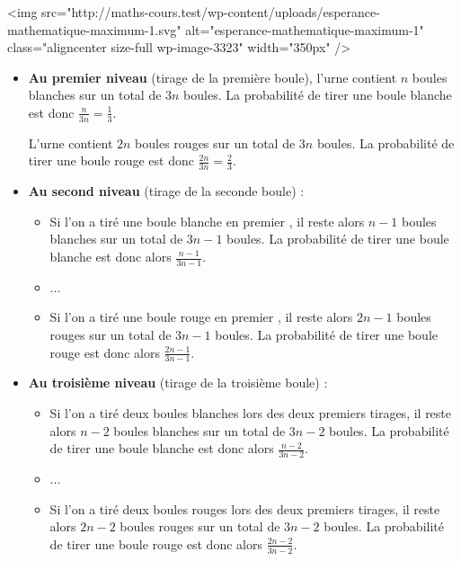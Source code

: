 \begin{corrige}
\begin{enumerate}
\begin{center}
\begin{extern}
{      }
   \end{extern}
\end{center}
<img src="http://maths-cours.test/wp-content/uploads/esperance-mathematique-maximum-1.svg" alt="esperance-mathematique-maximum-1" class="aligncenter size-full wp-image-3323" width="350px" />
          \begin{itemize}
               \item
               \textbf{Au premier niveau} (tirage de la première boule), l'urne contient $n$ boules blanches sur un total de $3n$ boules. La probabilité de tirer une boule blanche est donc $\frac{n}{3n} = \frac{1}{3}$.
               \par
               L'urne contient $2n$ boules rouges sur un total de $3n$ boules. La probabilité de tirer une boule rouge est donc $\frac{2n}{3n} = \frac{2}{3}$.
               \item
               \textbf{Au second niveau} (tirage de la seconde boule) :
               \begin{itemize}
                    \item
                    Si l'on a tiré une boule blanche en premier ,  il reste alors $n-1$ boules blanches sur un total de $3n-1$ boules. La probabilité de tirer une boule blanche est donc alors $\frac{n-1}{3n-1}$.
                    \item
                    ...
                    \item
                    Si l'on a tiré une boule rouge  en premier ,  il reste alors $2n-1$ boules rouges sur un total de $3n-1$ boules. La probabilité de tirer une boule rouge est donc alors $\frac{2n-1}{3n-1}$.
               \end{itemize}
               \item
               \textbf{Au troisième niveau} (tirage de la troisième boule) :
               \begin{itemize}
                    \item
                    Si l'on a tiré deux boules blanches lors des deux premiers tirages,  il reste alors $n-2$ boules blanches sur un total de $3n-2$ boules. La probabilité de tirer une boule blanche est donc alors $\frac{n-2}{3n-2}$.
                    \item
                    ...
                    \item
                    Si l'on a tiré deux boules rouges lors des deux premiers tirages, il reste alors $2n-2$ boules rouges sur un total de $3n-2$ boules. La probabilité de tirer une boule rouge est donc alors $\frac{2n-2}{3n-2}$.

\end{itemize}
\end{itemize}
\end{enumerate}
\end{corrige}
